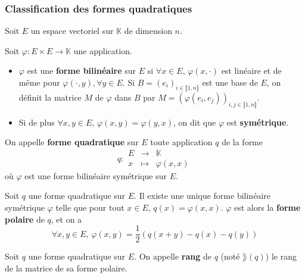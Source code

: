	\subsubsection{Classification des formes quadratiques}


	Soit $E$ un espace vectoriel sur $\mathbb{K}$ de dimension $n$.

	\begin{definition}
		Soit $\varphi : E \times E \rightarrow \mathbb{K}$ une application.
		\begin{itemize}
			\item $\varphi$ est une \textbf{forme bilinéaire} sur $E$ si $\forall x \in E, \, \varphi(x,\cdot)$ est linéaire et de même pour $\varphi(\cdot,y), \forall y \in E$. Si $B=(e_i)_{i \in \llbracket 1, n \rrbracket}$ est une base de $E$, on définit la matrice $M$ de $\varphi$ dans $B$ par $M=(\varphi(e_i,e_j))_{i,j \in \llbracket 1, n \rrbracket}$.
			\item Si de plus $\forall x, y \in E, \, \varphi(x, y) = \varphi(y, x)$, on dit que $\varphi$ est \textbf{symétrique}.
		\end{itemize}
	\end{definition}

	\begin{definition}
		On appelle \textbf{forme quadratique} sur $E$ toute application $q$ de la forme
		\[
		q :
		\begin{array}{ccc}
			E &\rightarrow& \mathbb{K} \\
			x &\mapsto& \varphi(x, x)
		\end{array}
		\]
		où $\varphi$ est une forme bilinéaire symétrique sur $E$.
	\end{definition}

	\begin{proposition}
		Soit $q$ une forme quadratique sur $E$. Il existe une unique forme bilinéaire symétrique $\varphi$ telle que pour tout $x \in E$, $q(x)=\varphi(x,x)$.
		\newpar
		$\varphi$ est alors la \textbf{forme polaire} de $q$, et on a
		\[ \forall x, y \in E, \, \varphi(x,y) = \frac{1}{2} (q(x+y) - q(x) - q(y)) \]
	\end{proposition}

	\begin{definition}
		Soit $q$ une forme quadratique sur $E$. On appelle \textbf{rang} de $q$ (noté $\rang(q)$) le rang de la matrice de sa forme polaire.
	\end{definition}

